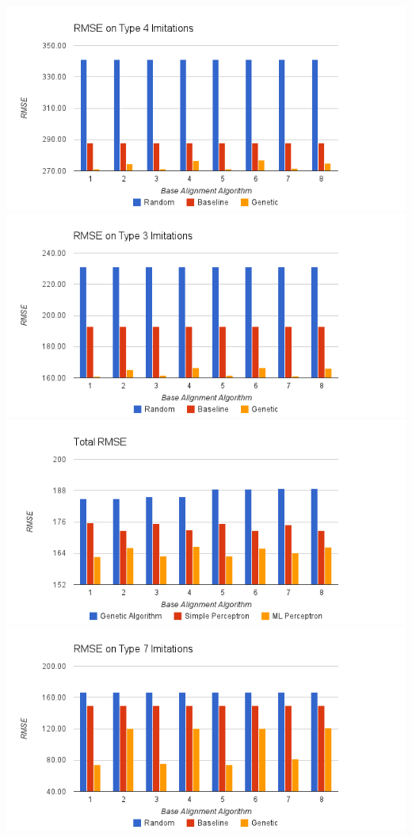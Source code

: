 \includegraphics[width=16cm]{images/chart2.png}
\includegraphics[width=16cm]{images/chart3.png}
\includegraphics[width=16cm]{images/chart4.png}
\includegraphics[width=16cm]{images/chart5.png}
